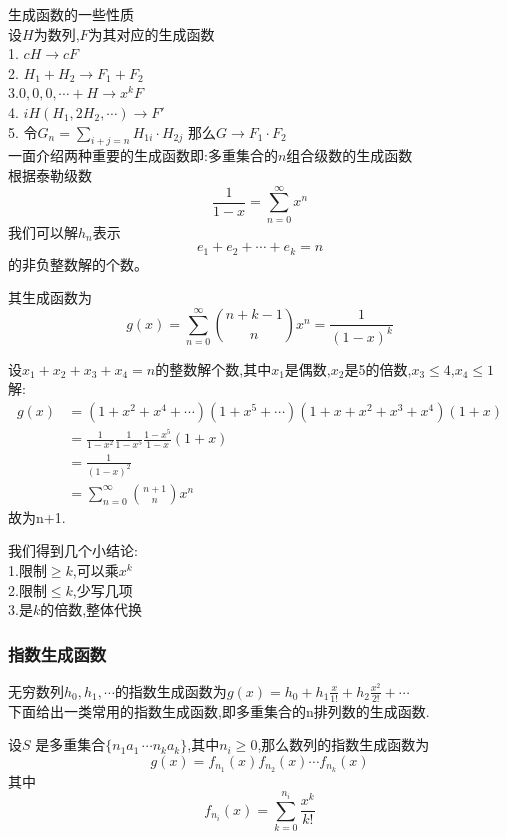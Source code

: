 生成函数的一些性质\\
设$H$为数列,$F$为其对应的生成函数\\
1. $cH \rightarrow cF$\\
2. $H_1+H_2 \rightarrow F_1 +F_2$\\
3.${0,0,0,\cdots}+H \rightarrow x^kF$\\
4. $iH(H_1,2H_2,\cdots) \rightarrow F'$\\
5. 令$G_n=\sum_{i+j=n} H_{1i}\cdot H_{2j}$
那么$G\rightarrow F_1\cdot F_2$\\
一面介绍两种重要的生成函数即:多重集合的$n$组合级数的生成函数\\
根据泰勒级数
\[
\frac{1}{1-x}=\sum_{n=0}^{\infty}x^n
\]
我们可以解$h_n$表示
\[
e_1+e_2+\cdots+e_k=n
\]
的非负整数解的个数。

其生成函数为
$$
g(x)=\sum_{n=0}^{\infty} \binom{n+k-1}{n}x^n=\frac{1}{(1-x)^k}
$$

\begin{example}
  设$x_1+x_2+x_3+x_4=n$的整数解个数,其中$x_1$是偶数,$x_2$是5的倍数,$x_3\le 4$,$x_4\le 1$ \\
  解:\\
  $$
  \begin{aligned}
    g(x)&=(1+x^2+x^4+\cdots)(1+x^5+\cdots)(1+x+x^2+x^3+x^4)(1+x)\\
    &=\frac{1}{1-x^2} \frac{1}{1-x^5} \frac{1-x^5}{1-x} (1+x)\\
    &=\frac{1}{(1-x)^2}\\
    &=\sum_{n=0}^{\infty} \binom{n+1}{n} x^n
  \end{aligned}
  $$
  故为n+1.
\end{example}
我们得到几个小结论:\\
1.限制$\ge k$,可以乘$x^k$\\
2.限制$\le k$,少写几项\\
3.是$k$的倍数,整体代换\\

\subsubsection{指数生成函数}
无穷数列$h_0,h_1,\cdots $的指数生成函数为$g(x)=h_0+h_1 \frac{x}{1!}+h_2 \frac{x^2}{2!}+\cdots $\\
下面给出一类常用的指数生成函数,即多重集合的n排列数的生成函数.\\
\begin{theorem}
  设$S$ 是多重集合$\{n_1 a_1\,\cdots n_k a_k\}$,其中$n_i\ge 0$,那么数列的指数生成函数为\\
  $$
  g(x)=f_{n_1}(x)f_{n_2}(x) \cdots f_{n_k} (x)
  $$
  其中
  $$
  f_{n_i}(x)=\sum_{k=0}^{n_i} \frac{x^k}{k!}
  $$
\end{theorem} 


